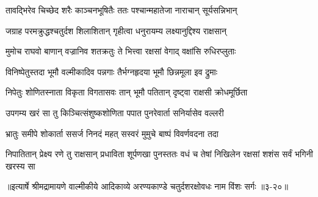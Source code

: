 \twolineshloka
{तावद्भिरेव चिच्छेद शरैः काञ्चनभूषितैः}
{ततः पश्चान्महातेजा नाराचान् सूर्यसन्निभान्} %

\twolineshloka
{जग्राह परमक्रुद्धश्चतुर्दश शिलाशितान्}
{गृहीत्वा धनुरायम्य लक्ष्यानुद्दिश्य राक्षसान्} %

\twolineshloka
{मुमोच राघवो बाणान् वज्रानिव शतक्रतुः}
{ते भित्त्वा रक्षसां वेगाद् वक्षांसि रुधिरप्लुताः} %

\twolineshloka
{विनिष्पेतुस्तदा भूमौ वल्मीकादिव पन्नगाः}
{तैर्भग्नहृदया भूमौ छिन्नमूला इव द्रुमाः} %

\twolineshloka
{निपेतुः शोणितस्नाता विकृता विगतासवः}
{तान् भूमौ पतितान् दृष्ट्वा राक्षसी क्रोधमूर्छिता} %

\twolineshloka
{उपगम्य खरं सा तु किञ्चित्संशुष्कशोणिता}
{पपात पुनरेवार्ता सनिर्यासेव वल्लरी} %

\twolineshloka
{भ्रातुः समीपे शोकार्ता ससर्ज निनदं महत्}
{सस्वरं मुमुचे बाष्पं विवर्णवदना तदा} %

\twolineshloka
{निपातितान् प्रेक्ष्य रणे तु राक्षसान् प्रधाविता शूर्पणखा पुनस्ततः}
{वधं च तेषां निखिलेन रक्षसां शशंस सर्वं भगिनी खरस्य सा} %


॥इत्यार्षे श्रीमद्रामायणे वाल्मीकीये आदिकाव्ये अरण्यकाण्डे चतुर्दशरक्षोवधः नाम विंशः सर्गः ॥३-२०॥
